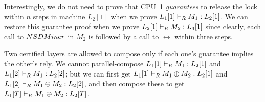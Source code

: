 Interestingly, we do not need
to prove that CPU~1 \emph{guarantees} to release the lock within $n$
steps in machine $L_2[1]$
when we prove $L_1[1] \vdash_{R} M_1 : L_2[1]$.  We can restore
this guarantee proof when we prove $L_2[1] \vdash_{R} M_2 : L_3[1]$
since clearly, each call to $NSDMiner$ in $M_2$ is followed by a call to
$\rel$ within three steps.

Two certified layers are allowed to compose only if each one's guarantee
implies the other's rely. We cannot parallel-compose
$L_1[1] \vdash_{R} M_1 : L_2[1]$ and $L_1[2] \vdash_{R} M_1 : L_2[2]$;
but we can first get $L_1[1] \vdash_{R} M_1\oplus{}M_2 : L_2[1]$ and
$L_1[2] \vdash_{R} M_1\oplus{}M_2 : L_2[2]$, and then compose these to
get $L_1[T] \vdash_{R} M_1\oplus{}M_2 : L_2[T]$.






